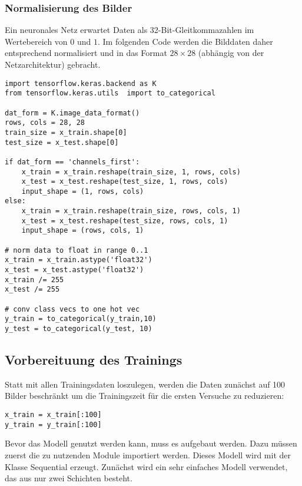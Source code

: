 \subsubsection{Normalisierung des Bilder}

Ein neuronales Netz erwartet Daten als 32-Bit-Gleitkommazahlen im Wertebereich von $0$ und $1$.
Im folgenden Code werden die Bilddaten daher entsprechend normalisiert und in das Format $28 \times 28$ 
(abhängig von der Netzarchitektur) gebracht.


\begin{verbatim}
import tensorflow.keras.backend as K
from tensorflow.keras.utils  import to_categorical

dat_form = K.image_data_format()
rows, cols = 28, 28
train_size = x_train.shape[0]
test_size = x_test.shape[0]

if dat_form == 'channels_first':
    x_train = x_train.reshape(train_size, 1, rows, cols)
    x_test = x_test.reshape(test_size, 1, rows, cols)
    input_shape = (1, rows, cols)
else:
    x_train = x_train.reshape(train_size, rows, cols, 1)
    x_test = x_test.reshape(test_size, rows, cols, 1)
    input_shape = (rows, cols, 1)

# norm data to float in range 0..1
x_train = x_train.astype('float32')
x_test = x_test.astype('float32')
x_train /= 255
x_test /= 255

# conv class vecs to one hot vec
y_train = to_categorical(y_train,10)
y_test = to_categorical(y_test, 10)
\end{verbatim}

\subsection{Vorbereituung des Trainings}

Statt mit allen Trainingsdaten loszulegen, werden die Daten zunächst auf 100
Bilder beschränkt um die Trainingszeit für die ersten Versuche zu reduzieren:

\medskip

\begin{verbatim}
x_train = x_train[:100]
y_train = y_train[:100]
\end{verbatim}

Bevor das Modell genutzt werden kann, muss es aufgebaut werden. 
Dazu müssen zuerst die zu nutzenden Module importiert werden. Dieses Modell wird mit der Klasse Sequential erzeugt.
Zunächst wird ein sehr einfaches Modell verwendet, das aus nur zwei Schichten besteht.

